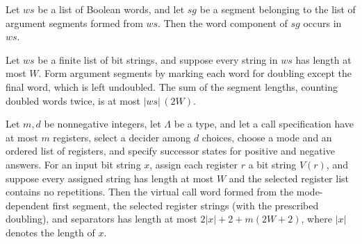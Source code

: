 \begin{lemma}
\label{Complexity.LogProg.mem_argSegs}
\leanok
{}
Let $ws$ be a list of Boolean words, and let $sg$ be a segment belonging to the list of
argument segments formed from $ws$. Then the word component of $sg$ occurs in $ws$.
\end{lemma}

\begin{lemma}
\label{Complexity.LogProg.sum_rlen_argSegs_le}
\leanok
{}
Let $ws$ be a finite list of bit strings, and suppose every string in $ws$ has length at
most $W$. Form argument segments by marking each word for doubling except the final
word, which is left undoubled. The sum of the segment lengths, counting doubled words
twice, is at most $|ws|\,(2W)$.
\end{lemma}

\begin{lemma}
\label{Complexity.LogProg.length_callSegs_le}
\leanok
{}
Let $m,d$ be nonnegative integers, let $\Lambda$ be a type, and let a call specification
have at most $m$ registers, select a decider among $d$ choices, choose a mode and an
ordered list of registers, and specify successor states for positive and negative
answers. For an input bit string $x$, assign each register $r$ a bit string $V(r)$, and
suppose every assigned string has length at most $W$ and the selected register list
contains no repetitions. Then the virtual call word formed from the mode-dependent first
segment, the selected register strings (with the prescribed doubling), and separators
has length at most $2|x|+2+m(2W+2)$, where $|x|$ denotes the length of $x$.
\end{lemma}

